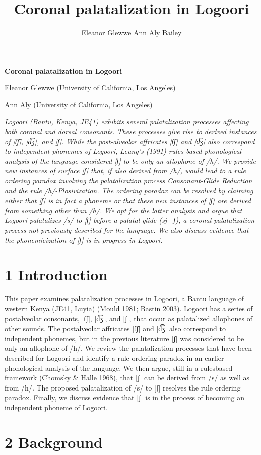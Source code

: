 \documentclass[output=paper]{langsci/langscibook}
\title{Coronal palatalization in Logoori}
\author{%
 Eleanor Glewwe\affiliation{}\lastand 
 Ann Aly Bailey \affiliation{}
}
\begin{document}
\setcounter{page}{1}
\textbf{Coronal palatalization in Logoori}

Eleanor Glewwe (University of California, Los Angeles)

Ann Aly (University of California, Los Angeles) 

\textit{Logoori (Bantu, Kenya, JE41) exhibits several palatalization processes affecting both coronal and dorsal consonants. These processes give rise to derived instances of [t͡ʃ], [d͡ʒ], and [ʃ]. While the post-alveolar affricates [t͡ʃ] and [d͡ʒ]  also correspond to independent phonemes of Logoori, Leung’s (1991) rules-based phonological analysis of the language considered [ʃ] to be only an allophone of /h/. We provide new instances of surface [ʃ] that, if also derived from /h/, would lead to a rule ordering paradox involving the palatalization process Consonant-Glide Reduction and the rule /h/-Plosivization. The ordering paradox can be resolved by claiming either that [ʃ] is in fact a phoneme or that these new instances of [ʃ] are derived from something other than /h/. We opt for the latter analysis and argue that Logoori palatalizes /s/ to [ʃ] before a palatal glide (sj }\textit{ ʃ), a coronal palatalization process not previously described for the language. We also discuss evidence that the phonemicization of [ʃ] is in progress in Logoori.   }

\chapter[1 Introduction]{1 Introduction}

This paper examines palatalization processes in Logoori, a Bantu language of western Kenya (JE41, Luyia) (Mould 1981; Bastin 2003). Logoori has a series of postalveolar consonants, [t͡ʃ], [d͡ʒ], and [ʃ], that occur as palatalized allophones of other sounds. The postalveolar affricates [t͡ʃ] and [d͡ʒ] also correspond to independent phonemes, but in the previous literature [ʃ] was considered to be only an allophone of /h/. We review the palatalization processes that have been described for Logoori and identify a rule ordering paradox in an earlier phonological analysis of the language. We then argue, still in a rulesbased framework (Chomsky \& Halle 1968), that [ʃ] can be derived from /s/ as well as from /h/. The proposed palatalization of /s/ to [ʃ] resolves the rule ordering paradox. Finally, we discuss evidence that [ʃ] is in the process of becoming an independent phoneme of Logoori.

\chapter{2 Background}
\end{document}
